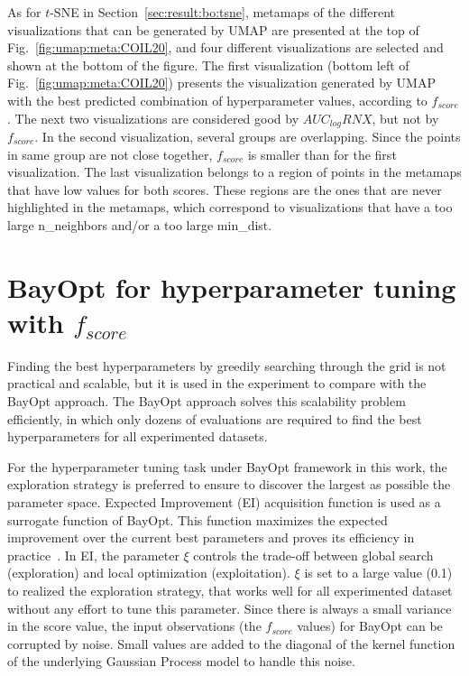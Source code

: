 As for $t$-SNE in Section~\ref{sec:result:bo:tsne}, metamaps of the different visualizations that can be generated by UMAP are presented at the top of Fig.~\ref{fig:umap:meta:COIL20}, and four different visualizations are selected and shown at the bottom of the figure.
The first visualization (bottom left of Fig.~\ref{fig:umap:meta:COIL20}) presents the visualization generated by UMAP with the best predicted combination of hyperparameter values, according to $f_{score}$.
The next two visualizations are considered good by $AUC_{log}RNX$, but not by $f_{score}$.
In the second visualization, several groups are overlapping. Since the points in same group are not close together, $f_{score}$ is smaller than for the first visualization.
The last visualization belongs to a region of points in the metamaps that have low values for both scores.
These regions are the ones that are never highlighted in the metamaps, which correspond to visualizations that have a too large {n\_neighbors} and/or a too large {min\_dist}. 

\section{BayOpt for hyperparameter tuning with $f_{score}$}\label{sec:apply-bayopt}

Finding the best hyperparameters by greedily searching through the grid is not practical and scalable, but it is used in the experiment to compare with the BayOpt approach.
The BayOpt approach solves this scalability problem efficiently, in which only dozens of evaluations are required to find the best hyperparameters for all experimented datasets.

For the hyperparameter tuning task under BayOpt framework in this work, the exploration strategy is preferred to ensure to discover the largest as possible the parameter space.
Expected Improvement (EI) acquisition function is used as a surrogate function of BayOpt.
This function maximizes the expected improvement over the current best parameters and proves its efficiency in practice~\cite{snoek2012practical}.
In EI, the parameter $\xi$ controls the trade-off between global search (exploration) and local optimization (exploitation).
$\xi$ is set to a large value (0.1) to realized the exploration strategy, that works well for all experimented dataset without any effort to tune this parameter.
Since there is always a small variance in the score value, 
the input observations (the $f_{score}$ values) for BayOpt can be corrupted by noise.
Small values are added to the diagonal of the kernel function of the underlying Gaussian Process model to handle this noise.


